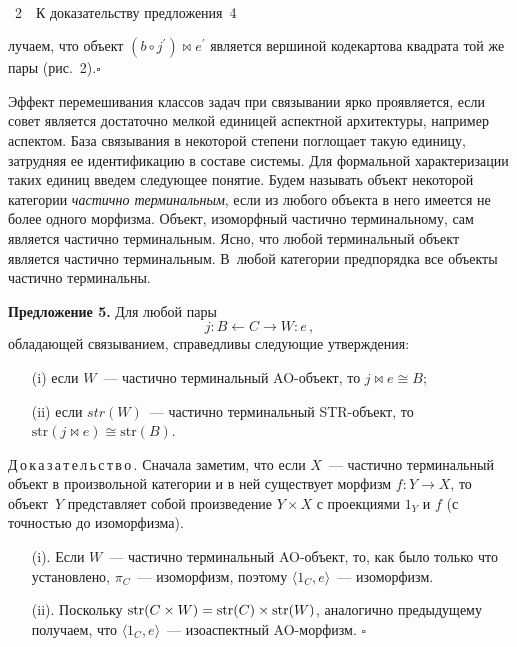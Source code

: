 \begin{multicols}{2}
\begin{center}
 \mbox{%
 \epsfxsize=78.086mm
 }
 


 
  \vspace*{6pt}
 
 {{\figurename~2}\ \ \small{К доказательству предложения~4}}
  \end{center}



\vspace*{15pt}

\addtocounter{figure}{1}

\noindent
лучаем, что объект $(b \circ  
j^\prime) \bowtie  e^\prime$ является вершиной кодекартова квадрата той же 
пары (рис.~2).\hfill$\square$




   Эффект перемешивания классов задач при связывании ярко проявляется, 
если совет является достаточно мелкой единицей аспектной архитектуры, 
например аспектом. База связывания в некоторой степени поглощает такую 
единицу, затрудняя ее идентификацию в составе системы. Для формальной 
характеризации таких единиц введем сле\-ду\-ющее понятие. Будем называть 
объект некоторой категории \textit{частично терминальным}, если из любого 
объекта в него имеется не более одного морфизма. Объект, изоморфный 
частично терминальному, сам является частично терминальным. Ясно, что 
любой терминальный объект является частично терминальным. В~любой 
категории предпорядка все объекты частично терминальны.
   
  \medskip
  
  \noindent
  \textbf{Предложение 5.} Для любой пары 
  $$
  j : B \leftarrow C\rightarrow W : e\,, 
  $$
обладающей связыванием, справедливы следующие утверждения:
   \begin{itemize}
\item[(i)] если $W$~--- частично терминальный AO-объ\-ект, то $j\bowtie  e 
\cong B$;
\item[(ii)] если $str(W)$~--- частично терминальный STR-объ\-ект, то $\mathrm{str}(j 
\bowtie  e) \cong \mathrm{str}(B)$.
  \end{itemize}
  
  \medskip
  
  \noindent
  Д\,о\,к\,а\,з\,а\,т\,е\,л\,ь\,с\,т\,в\,о\,. Сначала заметим, что если $X$~--- 
частично терминальный объект в произвольной категории и в ней существует 
морфизм $f : Y \rightarrow X$, то объект~$Y$ представляет собой произведение 
$Y\times X$ с проекциями $1_Y$ и $f$ (с точностью до изоморфизма).
   \begin{itemize}
   \item[(i).] Если $W$~--- частично терминальный AO-объ\-ект, то, как было 
только что установлено, $\pi_C$~--- изоморфизм, поэтому $\langle 1_C, 
e\rangle$~--- изоморфизм.
   \item[(ii).] Поскольку $\mathrm{str}(C \times  W) \hm= \mathrm{str}(C) \times \mathrm{str}(W)$, аналогично 
предыдущему получаем, что $\langle 1_C,e\rangle$~--- изоаспектный 
   AO-мор\-физм. \hfill$\square$
   \end{itemize}
   

\end{multicols}
